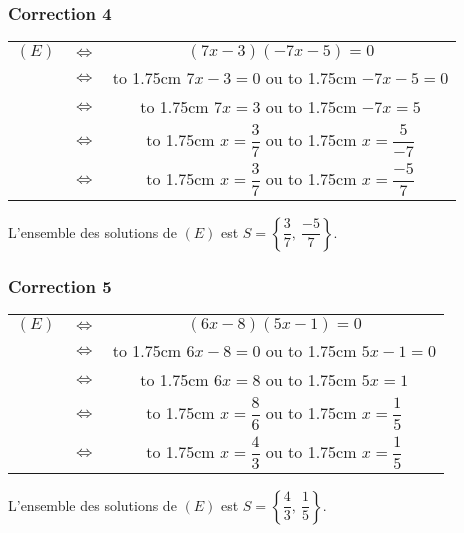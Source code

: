 \documentclass[15pt, mathserif]{beamer}
\begin{document}
\begin{frame}
\vspace{-10mm}
	\frametitle{Correction 4}
	\begin{tabular}{ccc} $(E)$ & $\Leftrightarrow$ & $(7x-3)(-7x-5)=0$  \\
		& $\Leftrightarrow$ &  \hbox to 1.75cm {\hfill $7x-3= 0$\hfill} \quad  ou \quad  \hbox to 1.75cm {\hfill $-7x-5=0$\hfill} \\
		 & $\Leftrightarrow$ & \hbox to 1.75cm {\hfill $7x = 3$\hfill} \quad  ou \quad \hbox to 1.75cm {\hfill $-7x = 5$\hfill} \\[1.5ex]
		 & $\Leftrightarrow$ & \hbox to 1.75cm {\hfill $x= \dfrac{3}{7}$\hfill} \quad  ou \quad \hbox to 1.75cm {\hfill $x= \dfrac{5}{-7}$\hfill} \\[2.5ex]
		 & $\Leftrightarrow$ & \hbox to 1.75cm {\hfill $x = \dfrac{3}{7}$\hfill} \quad  ou \quad \hbox to 1.75cm {\hfill $x = \dfrac{-5}{7}$\hfill}
	\end{tabular}

\bigskip

L'ensemble des solutions de $(E)$ est $S=\left\{\dfrac{3}{7},~\dfrac{-5}{7}\right\}$.\end{frame}


\begin{frame}
\vspace{-10mm}
	\frametitle{Correction 5}
	\begin{tabular}{ccc} $(E)$ & $\Leftrightarrow$ & $(6x-8)(5x-1)=0$  \\
		& $\Leftrightarrow$ &  \hbox to 1.75cm {\hfill $6x-8= 0$\hfill} \quad  ou \quad  \hbox to 1.75cm {\hfill $5x-1=0$\hfill} \\
		 & $\Leftrightarrow$ & \hbox to 1.75cm {\hfill $6x = 8$\hfill} \quad  ou \quad \hbox to 1.75cm {\hfill $5x = 1$\hfill} \\[1.5ex]
		 & $\Leftrightarrow$ & \hbox to 1.75cm {\hfill $x= \dfrac{8}{6}$\hfill} \quad  ou \quad \hbox to 1.75cm {\hfill $x= \dfrac{1}{5}$\hfill} \\[2.5ex]
		 & $\Leftrightarrow$ & \hbox to 1.75cm {\hfill $x = \dfrac{4}{3}$\hfill} \quad  ou \quad \hbox to 1.75cm {\hfill $x = \dfrac{1}{5}$\hfill}
	\end{tabular}

\bigskip

L'ensemble des solutions de $(E)$ est $S=\left\{\dfrac{4}{3},~\dfrac{1}{5}\right\}$.\end{frame}
\end{document}
